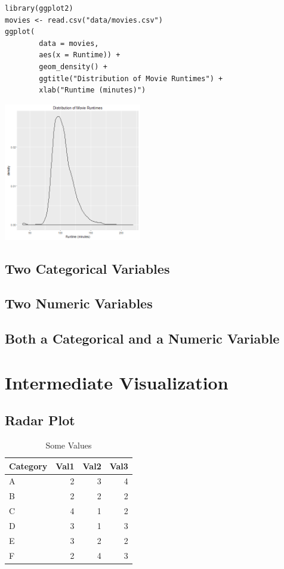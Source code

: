 \documentclass[a4paper, captions=tableheading]{tufte-book}
\begin{document}
\begin{verbatim}
library(ggplot2)
movies <- read.csv("data/movies.csv")
ggplot(
		data = movies,
		aes(x = Runtime)) +
		geom_density() +
		ggtitle("Distribution of Movie Runtimes") +
		xlab("Runtime (minutes)")
\end{verbatim}

\includegraphics[height=6cm]{img/1-num-ggplot2-04.png}

\section{Two Categorical Variables}
\label{sec:orgheadline11}

\section{Two Numeric Variables}
\label{sec:orgheadline12}

\section{Both a Categorical and a Numeric Variable}
\label{sec:orgheadline13}

\chapter{Intermediate Visualization}
\label{sec:orgheadline16}

\section{Radar Plot}
\label{sec:orgheadline15}

\begin{table}\footnotesize
\caption{\label{tab:orgtable1}
Some Values}
\centering
\begin{tabular}{lrrr}
\toprule
Category & Val1 & Val2 & Val3\\
\midrule
A & 2 & 3 & 4\\
B & 2 & 2 & 2\\
C & 4 & 1 & 2\\
D & 3 & 1 & 3\\
E & 3 & 2 & 2\\
F & 2 & 4 & 3\\
\bottomrule
\end{tabular}
\end{table}
\end{document}
